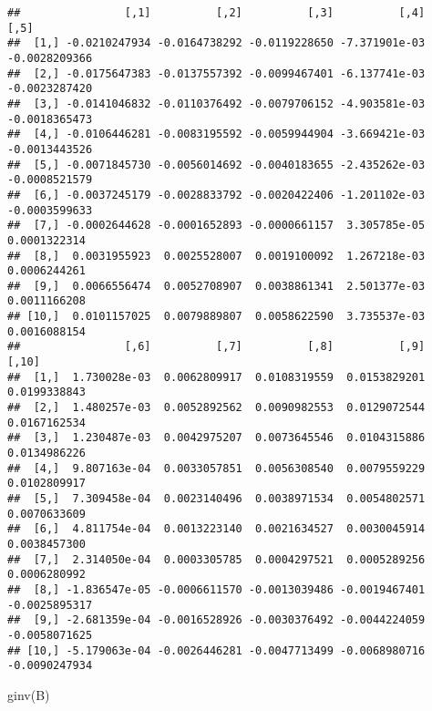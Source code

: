 \documentclass[
]{article}
\newenvironment{Shaded}{\begin{snugshade}}{\end{snugshade}}
\newcommand{\FunctionTok}[1]{\textcolor[rgb]{0.00,0.00,0.00}{#1}}
\newcommand{\NormalTok}[1]{#1}
\begin{document}
\begin{verbatim}
##                [,1]          [,2]          [,3]          [,4]          [,5]
##  [1,] -0.0210247934 -0.0164738292 -0.0119228650 -7.371901e-03 -0.0028209366
##  [2,] -0.0175647383 -0.0137557392 -0.0099467401 -6.137741e-03 -0.0023287420
##  [3,] -0.0141046832 -0.0110376492 -0.0079706152 -4.903581e-03 -0.0018365473
##  [4,] -0.0106446281 -0.0083195592 -0.0059944904 -3.669421e-03 -0.0013443526
##  [5,] -0.0071845730 -0.0056014692 -0.0040183655 -2.435262e-03 -0.0008521579
##  [6,] -0.0037245179 -0.0028833792 -0.0020422406 -1.201102e-03 -0.0003599633
##  [7,] -0.0002644628 -0.0001652893 -0.0000661157  3.305785e-05  0.0001322314
##  [8,]  0.0031955923  0.0025528007  0.0019100092  1.267218e-03  0.0006244261
##  [9,]  0.0066556474  0.0052708907  0.0038861341  2.501377e-03  0.0011166208
## [10,]  0.0101157025  0.0079889807  0.0058622590  3.735537e-03  0.0016088154
##                [,6]          [,7]          [,8]          [,9]         [,10]
##  [1,]  1.730028e-03  0.0062809917  0.0108319559  0.0153829201  0.0199338843
##  [2,]  1.480257e-03  0.0052892562  0.0090982553  0.0129072544  0.0167162534
##  [3,]  1.230487e-03  0.0042975207  0.0073645546  0.0104315886  0.0134986226
##  [4,]  9.807163e-04  0.0033057851  0.0056308540  0.0079559229  0.0102809917
##  [5,]  7.309458e-04  0.0023140496  0.0038971534  0.0054802571  0.0070633609
##  [6,]  4.811754e-04  0.0013223140  0.0021634527  0.0030045914  0.0038457300
##  [7,]  2.314050e-04  0.0003305785  0.0004297521  0.0005289256  0.0006280992
##  [8,] -1.836547e-05 -0.0006611570 -0.0013039486 -0.0019467401 -0.0025895317
##  [9,] -2.681359e-04 -0.0016528926 -0.0030376492 -0.0044224059 -0.0058071625
## [10,] -5.179063e-04 -0.0026446281 -0.0047713499 -0.0068980716 -0.0090247934
\end{verbatim}

\begin{Shaded}
\begin{Highlighting}[]
\FunctionTok{ginv}\NormalTok{(B)}
\end{Highlighting}
\end{Shaded}
\end{document}
